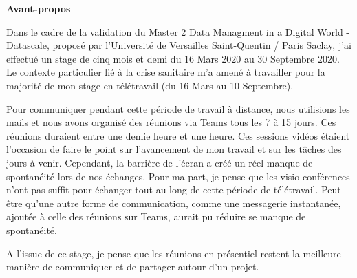 \documentclass{article}
\begin{document}
\vspace*{3.6cm}
\begin{center}
	\textbf{Avant-propos}
\end{center}
\hspace*{0.4cm}
Dans le cadre de la validation du Master 2 Data Managment in a Digital World - Datascale, proposé par l'Université de Versailles Saint-Quentin / Paris Saclay, j'ai effectué un stage de cinq mois et demi du 16 Mars 2020 au 30 Septembre 2020.
Le contexte particulier lié à la crise sanitaire m'a amené à travailler pour la majorité de mon stage en télétravail (du 16 Mars au 10 Septembre).\par
Pour communiquer pendant cette période de travail à distance, nous utilisions les mails et nous avons organisé des réunions via Teams tous les 7 à 15 jours.
Ces réunions duraient entre une demie heure et une heure.
Ces sessions vidéos étaient l'occasion de faire le point sur l'avancement de mon travail et sur les tâches des jours à venir.
Cependant, la barrière de l'écran a créé un réel manque de spontanéité lors de nos échanges.
Pour ma part, je pense que les visio-conférences n'ont pas suffit pour échanger tout au long de cette période de télétravail. 
Peut-être qu'une autre forme de communication, comme une messagerie instantanée, ajoutée à celle des réunions sur Teams, aurait pu réduire se manque de spontanéité.\par
A l'issue de ce stage, je pense que les réunions en présentiel restent la meilleure manière de communiquer et de partager autour d'un projet.

\newpage
\renewcommand{\contentsname}{Table des matières}\tableofcontents

\newpage
\end{document}
